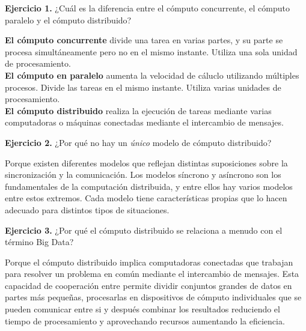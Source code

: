 \documentclass[12pt]{article}
\begin{document}
\begin{ejercicio}
\textbf{Ejercicio 1.} ¿Cuál es la diferencia entre el cómputo concurrente, el cómputo paralelo y el cómputo distribuido?
\end{ejercicio}
\textbf{El cómputo concurrente} divide una tarea en varias partes, y su parte se procesa simultáneamente pero no en el mismo instante. Utiliza una sola unidad de procesamiento.\\
\textbf{El cómputo en paralelo} aumenta la velocidad de cáluclo utilizando múltiples procesos. Divide las tareas en el mismo instante. Utiliza varias unidades de procesamiento.\\
\textbf{El cómputo distribuido} realiza la ejecución de tareas mediante varias computadoras o máquinas conectadas mediante el intercambio de mensajes.
\vspace{0.5cm}
\begin{ejercicio}
\textbf{Ejercicio 2.} ¿Por qué no hay un \textit{único} modelo de cómputo distribuido?
\end{ejercicio}
Porque existen diferentes modelos que reflejan distintas suposiciones sobre la sincronización y la comunicación. Los modelos síncrono y asíncrono son los fundamentales de la computación distribuida, y entre ellos hay varios modelos entre estos extremos. Cada modelo tiene características propias que lo hacen adecuado para distintos tipos de situaciones.
\vspace{0.5cm}
\begin{ejercicio}
\textbf{Ejercicio 3.} ¿Por qué el cómputo distribuido se relaciona a menudo con el término Big Data?
\end{ejercicio}
Porque el cómputo distribuido implica computadoras conectadas que trabajan para resolver un problema en común mediante el intercambio de mensajes. Esta capacidad de cooperación entre permite dividir conjuntos grandes de datos en partes más pequeñas, procesarlas en dispositivos de cómputo individuales que se pueden comunicar entre si y después combinar los resultados reduciendo el tiempo de procesamiento y aprovechando recursos aumentando la eficiencia.\\
\end{document}
